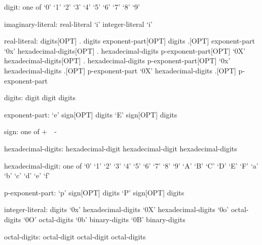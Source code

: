 \begin{syntax}
digit: one of
  `0' `1' `2' `3' `4' `5' `6' `7' `8' `9'
\end{syntax}

\begin{syntax}
imaginary-literal:
  real-literal `i'
  integer-literal `i'
\end{syntax}

\begin{syntax}
real-literal:
  digits[OPT] . digits exponent-part[OPT]
  digits .[OPT] exponent-part
  `0x' hexadecimal-digits[OPT] . hexadecimal-digits p-exponent-part[OPT]
  `0X' hexadecimal-digits[OPT] . hexadecimal-digits p-exponent-part[OPT]
  `0x' hexadecimal-digits .[OPT] p-exponent-part
  `0X' hexadecimal-digits .[OPT] p-exponent-part
\end{syntax}

\begin{syntax}
digits:
  digit
  digit digits
\end{syntax}

\begin{syntax}
exponent-part:
  `e' sign[OPT] digits
  `E' sign[OPT] digits
\end{syntax}

\begin{syntax}
sign: one of
  + $ $ $ $ -
\end{syntax}

\begin{syntax}
hexadecimal-digits:
  hexadecimal-digit
  hexadecimal-digit hexadecimal-digits
\end{syntax}

\begin{syntax}
hexadecimal-digit: one of
  `0' `1' `2' `3' `4' `5' `6' `7' `8' `9' `A' `B' `C' `D' `E' `F' `a' `b' `c' `d' `e' `f'
\end{syntax}

\begin{syntax}
p-exponent-part:
  `p' sign[OPT] digits
  `P' sign[OPT] digits
\end{syntax}

\begin{syntax}
integer-literal:
  digits
  `0x' hexadecimal-digits
  `0X' hexadecimal-digits
  `0o' octal-digits
  `0O' octal-digits
  `0b' binary-digits
  `0B' binary-digits
\end{syntax}

\begin{syntax}
octal-digits:
  octal-digit
  octal-digit octal-digits
\end{syntax}


